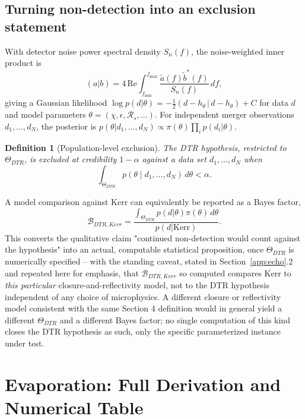 \documentclass[11pt]{article}
\newtheorem{definition}{Definition}
\begin{document}
\subsection{Turning non-detection into an exclusion statement}
\label{app:echo_stats}

With detector noise power spectral density $S_n(f)$, the noise-weighted inner product is \cite{veitchetal2015}
\begin{equation}
(a|b) = 4\,\mathrm{Re}\int_{f_{\min}}^{f_{\max}} \frac{\tilde a(f)\tilde b^*(f)}{S_n(f)}\, df,
\end{equation}
giving a Gaussian likelihood $\log p(d|\theta) = -\tfrac12(d-h_\theta \,|\, d-h_\theta) + C$ for data $d$ and model parameters $\theta=(\chi,\epsilon,\mathcal{R}_s,\dots)$. For independent merger observations $d_1,\dots,d_N$, the posterior is $p(\theta|d_1,\dots,d_N)\propto \pi(\theta)\prod_i p(d_i|\theta)$.

\begin{definition}[Population-level exclusion]
The DTR hypothesis, restricted to $\Theta_{DTR}$, is excluded at credibility $1-\alpha$ against a data set $d_1,\dots,d_N$ when
\begin{equation}
\int_{\Theta_{DTR}} p(\theta \mid d_1,\dots,d_N)\, d\theta < \alpha.
\end{equation}
\end{definition}
A model comparison against Kerr can equivalently be reported as a Bayes factor,
\begin{equation}
\mathcal{B}_{DTR,Kerr} = \frac{\int_{\Theta_{DTR}} p(d|\theta)\pi(\theta)\, d\theta}{p(d|\mathrm{Kerr})}.
\end{equation}
This converts the qualitative claim "continued non-detection would count against the hypothesis" into an actual, computable statistical proposition, once $\Theta_{DTR}$ is numerically specified -- with the standing caveat, stated in Section~\ref{app:echo}.2 and repeated here for emphasis, that $\mathcal{B}_{DTR,Kerr}$ so computed compares Kerr to \emph{this particular} closure-and-reflectivity model, not to the DTR hypothesis independent of any choice of microphysics. A different closure or reflectivity model consistent with the same Section 4 definition would in general yield a different $\Theta_{DTR}$ and a different Bayes factor; no single computation of this kind closes the DTR hypothesis as such, only the specific parameterized instance under test.

\section{Evaporation: Full Derivation and Numerical Table}
\label{app:evaporation}
\end{document}
